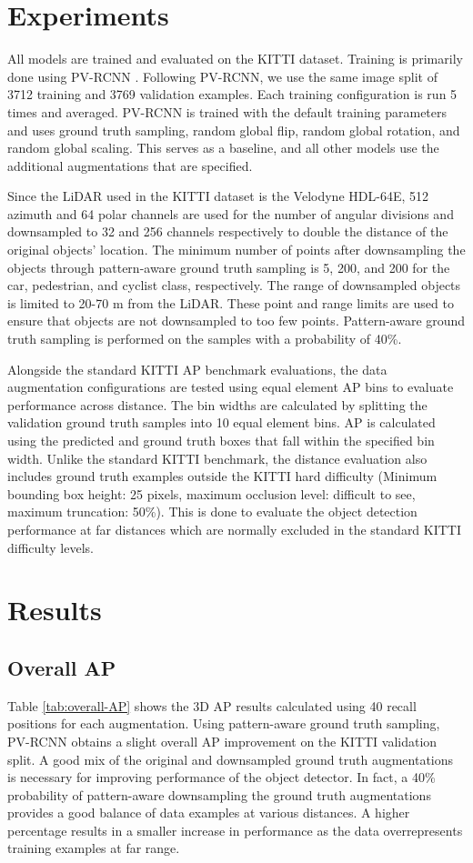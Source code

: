 \documentclass[10pt, conference, compsocconf]{IEEEtran}
\begin{document}
\section{Experiments}
\label{sec:experiments}
All models are trained and evaluated on the KITTI dataset. Training is primarily done using PV-RCNN \cite{Shi2020}. Following PV-RCNN, we use the same image split of 3712 training and 3769 validation examples. Each training configuration is run 5 times and averaged. PV-RCNN is trained with the default training parameters and uses ground truth sampling, random global flip, random global rotation, and random global scaling. This serves as a baseline, and all other models use the additional augmentations that are specified.

 Since the LiDAR used in the KITTI dataset is the Velodyne HDL-64E, 512 azimuth and 64 polar channels are used for the number of angular divisions and downsampled to 32 and 256 channels respectively to double the distance of the original objects' location. The minimum number of points after downsampling the objects through pattern-aware ground truth sampling is 5, 200, and 200 for the car, pedestrian, and cyclist class, respectively.  The range of downsampled objects is limited to 20-70 m from the LiDAR. These point and range limits are used to ensure that objects are not downsampled to too few points. Pattern-aware ground truth sampling is performed on the samples with a probability of 40\%.
 
 Alongside the standard KITTI AP benchmark evaluations, the data augmentation configurations are tested using equal element AP bins to evaluate performance across distance. The bin widths are calculated by splitting the validation ground truth samples into 10 equal element bins. AP is calculated using the predicted and ground truth boxes that fall within the specified bin width. Unlike the standard KITTI benchmark, the distance evaluation also includes ground truth examples outside the KITTI hard difficulty \cite{Geiger2012} (Minimum bounding box height: 25 pixels, maximum occlusion level: difficult to see, maximum truncation: 50\%). This is done to evaluate the object detection performance at far distances which are normally excluded in the standard KITTI difficulty levels.

\section{Results}
\subsection{Overall AP}
Table \ref{tab:overall-AP} shows the 3D AP results calculated using 40 recall positions for each augmentation. Using pattern-aware ground truth sampling, PV-RCNN obtains a slight overall AP improvement on the KITTI validation split. A good mix of the original and downsampled ground truth augmentations is necessary for improving performance of the object detector. In fact, a 40\% probability of pattern-aware downsampling the ground truth augmentations provides a good balance of data examples at various distances. A higher percentage results in a smaller increase in performance as the data overrepresents training examples at far range. 
\end{document}
